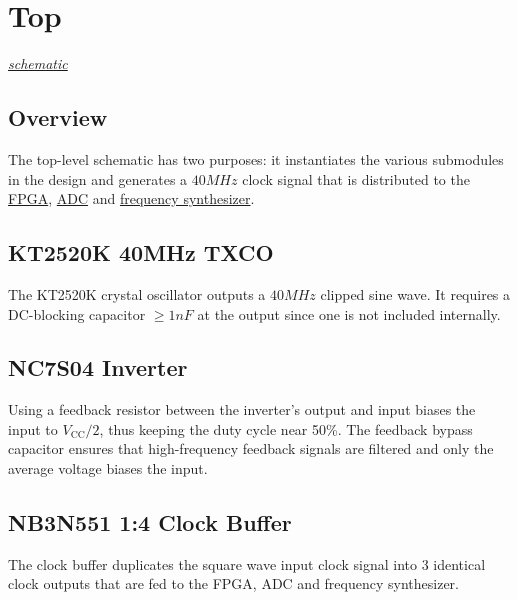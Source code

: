 \section{Top}
\label{sec:top}
\textit{\hyperlink{schematic.1}{schematic}}

\subsection{Overview}
\label{sec:top-overview}

The top-level schematic has two purposes: it instantiates the various submodules in the design and
generates a $40 \si{MHz}$ clock signal that is distributed to the
\hyperref[sec:xc7a15t-ftg256]{FPGA}, \hyperref[sec:ltc2292]{ADC} and
\hyperref[sec:adf4158]{frequency synthesizer}.

\subsection{KT2520K 40MHz TXCO}
\label{sec:kt2520k}

The KT2520K crystal oscillator outputs a $40 \si{MHz}$ clipped sine wave. It requires a DC-blocking
capacitor $\geq 1 \si{nF}$ at the output since one is not included internally.

\subsection{NC7S04 Inverter}
\label{sec:nc7s04}

Using a feedback resistor between the inverter's output and input biases the input to
$V_{\text{CC}}/2$, thus keeping the duty cycle near 50\%. The feedback bypass capacitor ensures that
high-frequency feedback signals are filtered and only the average voltage biases the input.

\subsection{NB3N551 1:4 Clock Buffer}
\label{sec:nb3n551}

The clock buffer duplicates the square wave input clock signal into 3 identical clock outputs that
are fed to the FPGA, ADC and frequency synthesizer.

